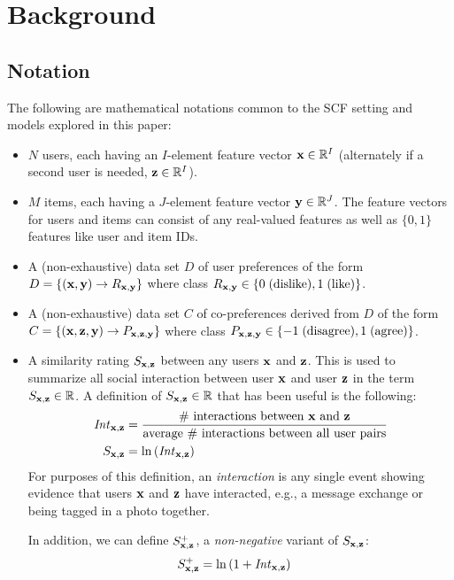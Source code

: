 
\chapter{Background}

\section{Notation}

The following are mathematical notations common to the SCF setting and models explored in this paper:

\begin{itemize}
\item $N$ users, each having an $I$-element feature vector 
$\mathbf{x} \in \mathbb{R}^I$ (alternately if a second user is needed, $\mathbf{z} \in \mathbb{R}^I$).

\item $M$ items, each having a $J$-element feature vector 
$\mathbf{y} \in \mathbb{R}^J$. The feature vectors for users 
and items can consist of any real-valued features as well as $\{0,1\}$
features like user and item IDs.

\item A (non-exhaustive) data set $D$ of user preferences of the form
$D = \{ (\mathbf{x}, \mathbf{y}) \to R_{\mathbf{x},\mathbf{y}} \}$ where class 
$R_{\mathbf{x},\mathbf{y}} \in \{ 0 \; \mbox{(dislike)}, 1 \; \mbox{(like)} \}$.

\item A (non-exhaustive) data set $C$ of co-preferences derived from $D$ of the form
$C = \{ (\mathbf{x}, \mathbf{z}, \mathbf{y}) \to P_{\mathbf{x}, \mathbf{z}, \mathbf{y}} \}$ where class 
$P_{\mathbf{x}, \mathbf{z}, \mathbf{y}} \in \{ -1 \; \mbox{(disagree)}, 1 \;\mbox{(agree)} \}$.  

\item A similarity rating $S_{\mathbf{x},\mathbf{z}}$ between any users $\mathbf{x}$ and $\mathbf{z}$. This is used to summarize all social
interaction between user $\mathbf{x}$ and user $\mathbf{z}$ in the term $S_{\mathbf{x},\mathbf{z}} \in
\mathbb{R}$.  A definition of $S_{\mathbf{x},\mathbf{z}} \in \mathbb{R}$ that has been useful is the
following:
\begin{align}
\mathit{Int}_{\mathbf{x},\mathbf{z}} & = \frac{\mbox{\# interactions between $\mathbf{x}$
and $\mathbf{z}$}}{\mbox{average \# interactions between all user pairs}}\\
S_{\mathbf{x},\mathbf{z}} & = \ln \left( \mathit{Int}_{\mathbf{x},\mathbf{z}} \right)
\end{align}
For purposes of this definition, an \emph{interaction} is any single event
showing evidence that users $\mathbf{x}$ and $\mathbf{z}$ have 
interacted, e.g., a message exchange or being tagged in a photo together.

In addition, we can define $S^+_{\mathbf{x},\mathbf{z}}$, a \emph{non-negative} 
variant of $S_{\mathbf{x},\mathbf{z}}$:
\begin{align}
S^+_{\mathbf{x},\mathbf{z}} & = \ln \left( 1 + \mathit{Int}_{\mathbf{x},\mathbf{z}} \right)
\end{align}
\end{itemize}

